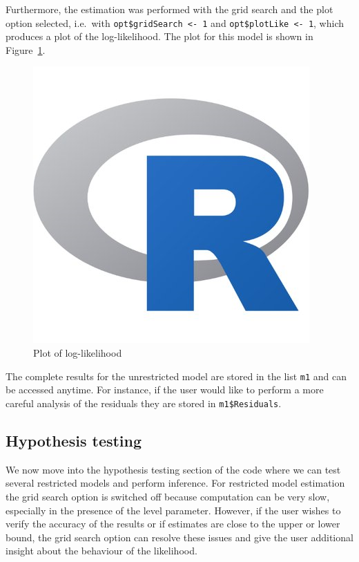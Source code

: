 \documentclass[article]{jss}
\begin{document}
Furthermore, the estimation was performed with the grid search and the plot option selected, i.e.\ with \verb|opt$gridSearch <- 1| and \verb|opt$plotLike <- 1|, which produces a plot of the log-likelihood. The plot for this model is shown in Figure~\ref{fig:m1_likelihood}.

\begin{figure}[H]
  \centering
  \includegraphics[scale = .6, keepaspectratio=true]{Figures/m1_likelihood.png}
  \caption{Plot of log-likelihood}
  \label{fig:m1_likelihood}
\end{figure}

The complete results for the unrestricted model are stored in the list \verb|m1| and can be accessed anytime. For instance, if the user would like to perform a more careful analysis of the residuals they are stored in \verb|m1$Residuals|.

\subsection{Hypothesis testing}
\label{subsec hypo}

We now move into the hypothesis testing section of the code where we can test several restricted models and perform inference. For restricted model estimation the grid search option is switched off because computation can be very slow, especially in the presence of the level parameter. However, if the user wishes to verify the accuracy of the results or if estimates are close to the upper or lower bound, the grid search option can resolve these issues and give the user additional insight about the behaviour of the likelihood.
\end{document}

